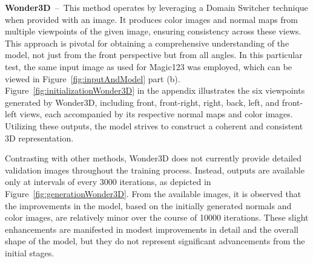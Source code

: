 \textbf{Wonder3D}~--~This method operates by leveraging a Domain Switcher technique when provided with an image. It produces color images and normal maps from multiple viewpoints of the given image, ensuring consistency across these views. This approach is pivotal for obtaining a comprehensive understanding of the model, not just from the front perspective but from all angles. In this particular test, the same input image as used for Magic123 was employed, which can be viewed in Figure~\ref{fig:inputAndModel} part (b). Figure~\ref{fig:initializationWonder3D} in the appendix illustrates the six viewpoints generated by Wonder3D, including front, front-right, right, back, left, and front-left views, each accompanied by its respective normal maps and color images. Utilizing these outputs, the model strives to construct a coherent and consistent 3D representation.

Contrasting with other methods, Wonder3D does not currently provide detailed validation images throughout the training process. Instead, outputs are available only at intervals of every 3000 iterations, as depicted in Figure~\ref{fig:generationWonder3D}. From the available images, it is observed that the improvements in the model, based on the initially generated normals and color images, are relatively minor over the course of 10000 iterations. These slight enhancements are manifested in modest improvements in detail and the overall shape of the model, but they do not represent significant advancements from the initial stages.

